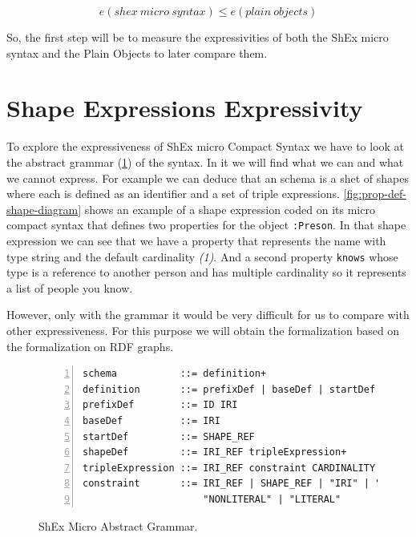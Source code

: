 \begin{equation} \label{eq:expressivity-question}
    e(shex\ micro\ syntax) \leq e(plain\ objects)
\end{equation}

So, the first step will be to measure the expressivities of both the ShEx micro syntax and the Plain Objects to later
compare them.


\section{Shape Expressions Expressivity}
To explore the expressiveness of ShEx micro Compact Syntax we have to look
at the abstract grammar (\cref{fig:shex-micro-abstract-grammar}) of the syntax.
In it we will find what we can and what we cannot express. For example we can
deduce that an schema is a shet of shapes where each is defined as an identifier
and a set of triple expressions. \cref{fig:prop-def-shape-diagram} shows an example
of a shape expression coded on its micro compact syntax that defines two properties
for the object \texttt{:Preson}. In that shape expression we can see that we have a
property that represents the name with type string and the default cardinality \textit{(1)}.
And a second property \texttt{knows} whose type is a reference to another person
and has multiple cardinality so it represents a list of people you know.

However, only with the grammar it would be very difficult
for us to compare with other expressiveness. For this purpose we will obtain the formalization
based on the \cite{milutinovic2019exploring} formalization on RDF graphs.

\begin{figure}
\begin{lstlisting}[numbers=left,basicstyle=\ttfamily\small]
schema           ::= definition+
definition       ::= prefixDef | baseDef | startDef | shapeDef
prefixDef        ::= ID IRI
baseDef          ::= IRI
startDef         ::= SHAPE_REF
shapeDef         ::= IRI_REF tripleExpression+
tripleExpression ::= IRI_REF constraint CARDINALITY
constraint       ::= IRI_REF | SHAPE_REF | "IRI" | "BNODE" |
                     "NONLITERAL" | "LITERAL"
\end{lstlisting}
\caption[ShEx Micro Abstract Grammar]{ShEx Micro Abstract Grammar.}
\label{fig:shex-micro-abstract-grammar}
\end{figure}

